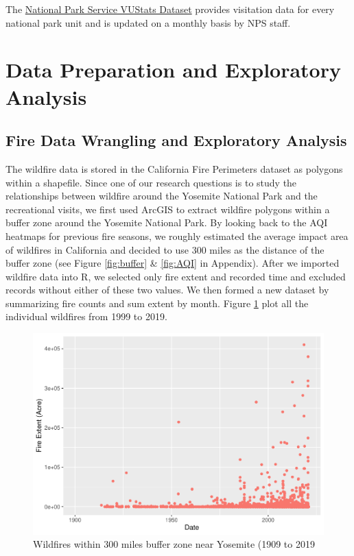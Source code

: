 \documentclass[
  12pt,
]{article}
\begin{document}
The \href{https://irma.nps.gov/STATS/Reports/Park/YOSE}{National Park Service VUStats Dataset} provides visitation data for every national park unit and is updated on a monthly basis by NPS staff.

\hypertarget{data-preparation-and-exploratory-analysis}{%
\section{Data Preparation and Exploratory Analysis}\label{data-preparation-and-exploratory-analysis}}

\hypertarget{fire-data-wrangling-and-exploratory-analysis}{%
\subsection{Fire Data Wrangling and Exploratory Analysis}\label{fire-data-wrangling-and-exploratory-analysis}}

The wildfire data is stored in the California Fire Perimeters dataset as polygons within a shapefile. Since one of our research questions is to study the relationships between wildfire around the Yosemite National Park and the recreational visits, we first used ArcGIS to extract wildfire polygons within a buffer zone around the Yosemite National Park. By looking back to the AQI heatmaps for previous fire seasons, we roughly estimated the average impact area of wildfires in California and decided to use 300 miles as the distance of the buffer zone (see Figure \ref{fig:buffer} \& \ref{fig:AQI} in Appendix).
After we imported wildfire data into R, we selected only fire extent and recorded time and excluded records without either of these two values. We then formed a new dataset by summarizing fire counts and sum extent by month.
Figure \ref{fig:FireExp1} plot all the individual wildfires from 1999 to 2019.

\begin{figure}
\centering
\includegraphics{CodeFinal_files/figure-latex/FireExp1-1.pdf}
\caption{\label{fig:FireExp1}Wildfires within 300 miles buffer zone near Yosemite (1909 to 2019}
\end{figure}
\end{document}
